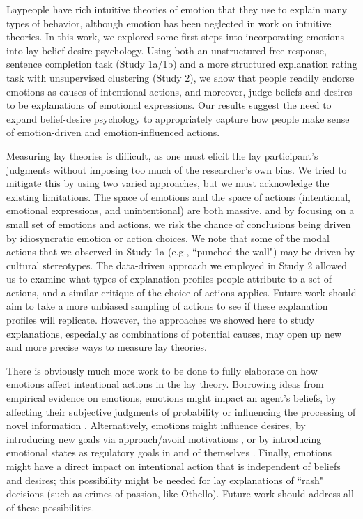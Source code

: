 \documentclass[10pt,letterpaper]{article}
\begin{document}
Laypeople have rich intuitive theories of emotion that they use to explain many types of behavior, although emotion has been neglected in work on intuitive theories. In this work, we explored some first steps into incorporating emotions into lay belief-desire psychology. Using both an unstructured free-response, sentence completion task (Study 1a/1b) and a more structured explanation rating task with unsupervised clustering (Study 2), we show that people readily endorse emotions as causes of intentional actions, and moreover, judge beliefs and desires to be explanations of emotional expressions. Our results suggest the need to expand belief-desire psychology to appropriately capture how people make sense of emotion-driven and emotion-influenced actions.

Measuring lay theories is difficult, as one must elicit the lay participant's judgments without imposing too much of the researcher's own bias. We tried to mitigate this by using two varied approaches, but we must acknowledge the existing limitations. The space of emotions and the space of actions (intentional, emotional expressions, and unintentional) are both massive, and by focusing on a small set of emotions and actions, we risk the chance of conclusions being driven by idiosyncratic emotion or action choices. We note that some of the modal actions that we observed in Study 1a (e.g., ``punched the wall") may be driven by cultural stereotypes. The data-driven approach we employed in Study 2 allowed us to examine what types of explanation profiles people attribute to a set of actions, and a similar critique of the choice of actions applies. Future work should aim to take a more unbiased sampling of actions to see if these explanation profiles will replicate. However, the approaches we showed here to study explanations, especially as combinations of potential causes, may open up new and more precise ways to measure lay theories.

There is obviously much more work to be done to fully elaborate on how emotions affect intentional actions in the lay theory. Borrowing ideas from empirical evidence on emotions, emotions might impact an agent's beliefs, by affecting their subjective judgments of probability \cite{Wright1992} or influencing the processing of novel information \cite{Forgas1995}. Alternatively, emotions might influence desires, by introducing new goals via approach/avoid motivations \cite{Carver2004}, or by introducing emotional states as regulatory goals in and of themselves \cite{Gross2006}. Finally, emotions might have a direct impact on intentional action that is independent of beliefs and desires; this possibility might be needed for lay explanations of ``rash" decisions (such as crimes of passion, like Othello). Future work should address all of these possibilities.
\end{document}
